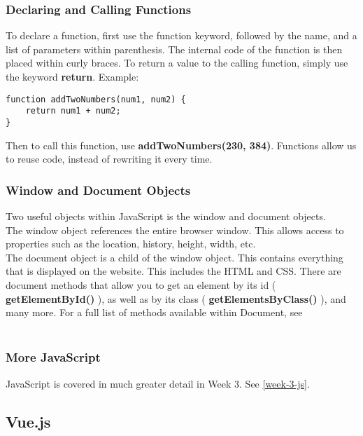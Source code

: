 \documentclass[portfolio.tex]{subfiles}
\begin{document}
				\subsubsection{Declaring and Calling Functions}
					To declare a function, first use the function keyword, followed by the name, and a list of parameters within parenthesis. The internal code of the function is then placed within curly braces. To return a value to the calling function, simply use the keyword \textbf{return}. Example:\\

					\begin{lstlisting}
function addTwoNumbers(num1, num2) {
	return num1 + num2;
}
					\end{lstlisting}
					\vspace{0.5cm}

					Then to call this function, use \textbf{addTwoNumbers(230, 384)}. Functions allow us to reuse code, instead of rewriting it every time.

				\subsubsection{Window and Document Objects}
					Two useful objects within JavaScript is the window and document objects. \\

					The window object references the entire browser window. This allows access to properties such as  the location, history, height, width, etc. \\

					The document object is a child of the window object. This contains everything that is displayed on the website. This includes the HTML and CSS. There are document methods that allow you to get an element by its id ( \textbf{getElementById()} ), as well as by its class ( \textbf{ getElementsByClass()}  ), and many more. For a full list of methods available within Document, see \\ \\


				\subsubsection{More JavaScript}
					JavaScript is covered in much greater detail in Week 3. See \ref{week-3-js}.\\

			\subsection{Vue.js}
\end{document}
